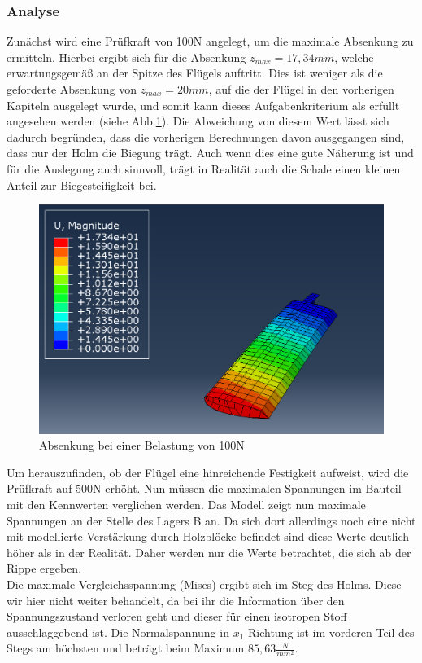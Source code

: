 \subsubsection{Analyse}
Zunächst wird eine Prüfkraft von 100N angelegt, um die maximale Absenkung zu ermitteln. Hierbei ergibt sich für die Absenkung $z_{max}=17,34mm$, welche erwartungsgemäß an der Spitze des Flügels auftritt. Dies ist weniger als die geforderte Absenkung von $z_{max}=20mm$, auf die der Flügel in den vorherigen Kapiteln ausgelegt wurde, und somit kann dieses Aufgabenkriterium als erfüllt angesehen werden (siehe Abb.\ref{Absenkung}). Die Abweichung von diesem Wert lässt sich dadurch begründen, dass die vorherigen Berechnungen davon ausgegangen sind, dass nur der Holm die Biegung trägt. Auch wenn dies eine gute Näherung ist und für die Auslegung auch sinnvoll, trägt in Realität auch die Schale einen kleinen Anteil zur Biegesteifigkeit bei.
\begin{figure}[h]
 \centering
 \includegraphics[scale=0.4]{Bilder/Absenkung_100N}
 \caption{Absenkung bei einer Belastung von 100N}
 \label{Absenkung}
\end{figure}
\noindent
Um herauszufinden, ob der Flügel eine hinreichende Festigkeit aufweist, wird die Prüfkraft auf 500N erhöht. Nun müssen die maximalen Spannungen im Bauteil mit den Kennwerten verglichen werden. Das Modell zeigt nun maximale Spannungen an der Stelle des Lagers B an. Da sich dort allerdings noch eine nicht mit modellierte Verstärkung durch Holzblöcke befindet sind diese Werte deutlich höher als in der Realität. Daher werden nur die Werte betrachtet, die sich ab der Rippe ergeben.\\
Die maximale Vergleichsspannung (Mises) ergibt sich im Steg des Holms. Diese wir hier nicht weiter behandelt, da bei ihr die Information über den Spannungszustand verloren geht und dieser für einen isotropen Stoff ausschlaggebend ist. Die Normalspannung in $x_{1}$-Richtung ist im vorderen Teil des Stegs am höchsten und beträgt beim Maximum $85,63\frac{N}{mm^2}$.\\

